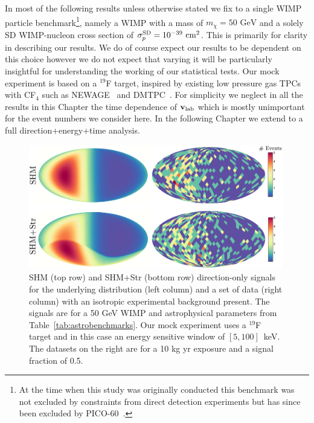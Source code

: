 In most of the following results unless otherwise stated we fix to a single WIMP particle benchmark\footnote{At the time when this study was originally conducted this benchmark was not excluded by constraints from direct detection experiments but has since been excluded by PICO-60~\cite{Amole:2017dex}.}, namely a WIMP with a mass of $m_\chi = 50 \, \, \mathrm{GeV}$ and a solely SD WIMP-nucleon cross section of $\sigma^{\rm SD}_p = 10^{-39} \, \, \mathrm{cm}^2$. This is primarily for clarity in describing our results. We do of course expect our results to be dependent on this choice however we do not expect that varying it will be particularly insightful for understanding the working of our statistical tests. Our mock experiment is based on a $^{19}$F target, inspired by existing low pressure gas TPCs with CF$_4$ such as NEWAGE~\cite{Nakamura:2015iza,Miuchi:2010hn} and DMTPC~\cite{Leyton:2016nit}. For simplicity we neglect in all the results in this Chapter the time dependence of $\textbf{v}_{\rm lab}$ which is mostly unimportant for the event numbers we consider here. In the following Chapter we extend to a full direction+energy+time analysis.

\begin{figure}
    \centering
    \includegraphics[trim = 0mm 0mm 0mm 0mm, clip, width=0.99\textwidth]{Figures/signal_comparison_skymap.eps}
    \caption[Simulated data for the SHM and SHM+Stream models]{SHM (top row) and SHM+Str (bottom row) direction-only signals for the underlying distribution (left column) and a set of data (right column) with an isotropic experimental background present. The signals are for a 50 GeV WIMP and astrophysical parameters from Table~\ref{tab:astrobenchmarks}. Our mock experiment uses a $^{19}$F target and in this case an energy sensitive window of $[5,100]$~keV. The datasets on the right are for a 10 kg yr exposure and a signal fraction of 0.5.}
    \label{fig:signal_comparison_skymap}
\end{figure}

